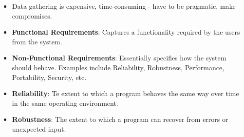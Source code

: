 \documentclass[a4paper]{article}
\begin{document}
\begin{itemize}
    \item Data gathering is expensive, time-consuming - have to be pragmatic, make compromises.
    \item \textbf{Functional Requirements}: Captures a functionality required by the users from the system.
    \item \textbf{Non-Functional Requirements}: Essentially specifies how the system should behave. Examples include Reliability, Robustness, Performance, Portability, Security, etc.
    \item \textbf{Reliability}: Te extent to which a program behaves the same way over time in the same operating environment.
    \item \textbf{Robustness}: The extent to which a program can recover from errors or unexpected input.
\end{itemize}
\end{document}
